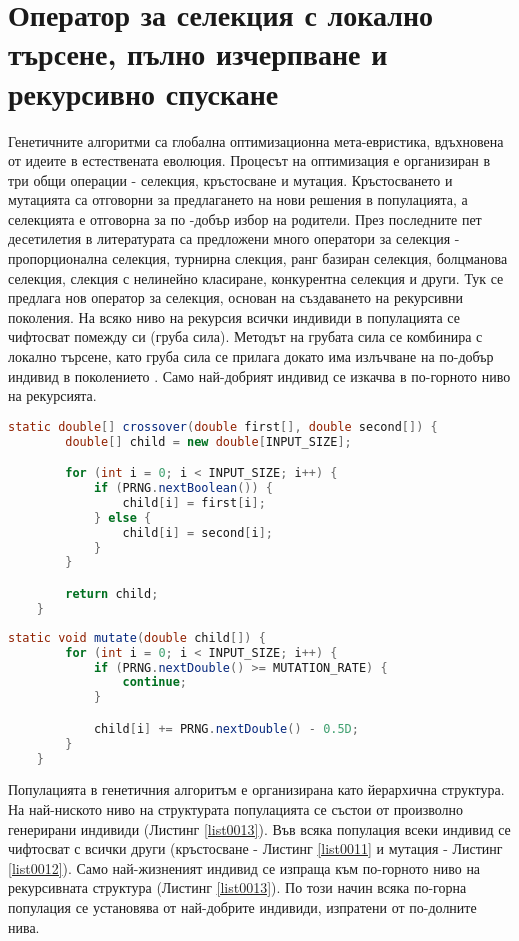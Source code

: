 \section{Оператор за селекция с локално търсене, пълно изчерпване и рекурсивно спускане}

Генетичните алгоритми са глобална оптимизационна мета-евристика, вдъхновена от идеите в естествената еволюция. Процесът на оптимизация е организиран в три общи операции - селекция, кръстосване и мутация. Кръстосването и мутацията са отговорни за предлагането на нови решения в популацията, а селекцията е отговорна за по -добър избор на родители. През последните пет десетилетия в литературата са предложени много оператори за селекция - пропорционална селекция, турнирна слекция, ранг базиран селекция, болцманова селекция, слекция с нелинейно класиране, конкурентна селекция и други. Тук се предлага нов оператор за селекция, основан на създаването на рекурсивни поколения. На всяко ниво на рекурсия всички индивиди в популацията се чифтосват помежду си (груба сила). Методът на грубата сила се комбинира с локално търсене, като груба сила се прилага докато има излъчване на по-добър индивид в поколението \cite{Balabanov-01}. Само най-добрият индивид се изкачва в по-горното ниво на рекурсията. 

\begin{lstlisting}[caption=Равномерно кръстосване, language=Java, basicstyle=\tiny, label=list0011]
	static double[] crossover(double first[], double second[]) {
		double[] child = new double[INPUT_SIZE];

		for (int i = 0; i < INPUT_SIZE; i++) {
			if (PRNG.nextBoolean()) {
				child[i] = first[i];
			} else {
				child[i] = second[i];
			}
		}

		return child;
	}
\end{lstlisting}

\begin{lstlisting}[caption=Мутация със случайно число, language=Java, basicstyle=\tiny, label=list0012]
	static void mutate(double child[]) {
		for (int i = 0; i < INPUT_SIZE; i++) {
			if (PRNG.nextDouble() >= MUTATION_RATE) {
				continue;
			}

			child[i] += PRNG.nextDouble() - 0.5D;
		}
	}
\end{lstlisting}

Популацията в генетичния алгоритъм е организирана като йерархична структура. На най-ниското ниво на структурата популацията се състои от произволно генерирани индивиди (Листинг \ref{list0013}). Във всяка популация всеки индивид се чифтосват с всички други (кръстосване - Листинг \ref{list0011} и мутация - Листинг \ref{list0012}). Само най-жизненият индивид се изпраща към по-горното ниво на рекурсивната структура (Листинг \ref{list0013}). По този начин всяка по-горна популация се установява от най-добрите индивиди, изпратени от по-долните нива.

